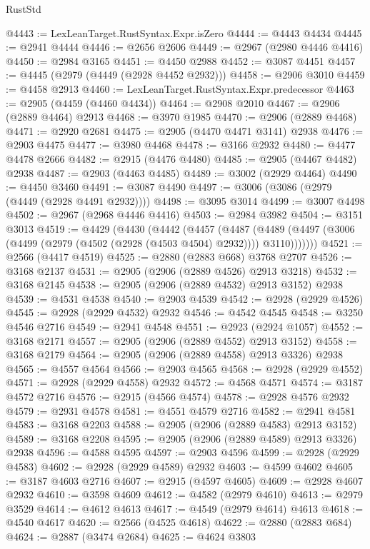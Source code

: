 \begin{lexlean}{RustStd}
\begin{coremodule}
{\begin{coremodule}
{{{{{{{{{{{{{{{{{{{{{{{{{{{{{{{{{{{{{{{{{{{{{{{{{{{{{{{{{{{{{{{{{{{{{{{{{{{{{{@4443 := LexLeanTarget.RustSyntax.Expr.isZero
@4444 := @4443 @4434
@4445 := @2941 @4444
@4446 := @2656 @2606
@4449 := @2967 (@2980 @4446 @4416)
@4450 := @2984 @3165
@4451 := @4450 @2988
@4452 := @3087 @4451
@4457 := @4445 (@2979 (@4449 (@2928 @4452 @2932)))
@4458 := @2906 @3010
@4459 := @4458 @2913
@4460 := LexLeanTarget.RustSyntax.Expr.predecessor
@4463 := @2905 (@4459 (@4460 @4434))
@4464 := @2908 @2010
@4467 := @2906 (@2889 @4464) @2913
@4468 := @3970 @1985
@4470 := @2906 (@2889 @4468)
@4471 := @2920 @2681
@4475 := @2905 (@4470 @4471 @3141) @2938
@4476 := @2903 @4475
@4477 := @3980 @4468
@4478 := @3166 @2932
@4480 := @4477 @4478 @2666
@4482 := @2915 (@4476 @4480)
@4485 := @2905 (@4467 @4482) @2938
@4487 := @2903 (@4463 @4485)
@4489 := @3002 (@2929 @4464)
@4490 := @4450 @3460
@4491 := @3087 @4490
@4497 := @3006 (@3086 (@2979 (@4449 (@2928 @4491 @2932))))
@4498 := @3095 @3014
@4499 := @3007 @4498
@4502 := @2967 (@2968 @4446 @4416)
@4503 := @2984 @3982
@4504 := @3151 @3013
@4519 := @4429
    (@4430
      (@4442
        (@4457
          (@4487
            (@4489 (@4497 (@3006 (@4499 (@2979 (@4502 (@2928 (@4503 @4504) @2932)))) @3110)))))))
@4521 := @2566 (@4417 @4519)
@4525 := @2880 (@2883 @668) @3768 @2707
@4526 := @3168 @2137
@4531 := @2905 (@2906 (@2889 @4526) @2913 @3218)
@4532 := @3168 @2145
@4538 := @2905 (@2906 (@2889 @4532) @2913 @3152) @2938
@4539 := @4531 @4538
@4540 := @2903 @4539
@4542 := @2928 (@2929 @4526)
@4545 := @2928 (@2929 @4532) @2932
@4546 := @4542 @4545
@4548 := @3250 @4546 @2716
@4549 := @2941 @4548
@4551 := @2923 (@2924 @1057)
@4552 := @3168 @2171
@4557 := @2905 (@2906 (@2889 @4552) @2913 @3152)
@4558 := @3168 @2179
@4564 := @2905 (@2906 (@2889 @4558) @2913 @3326) @2938
@4565 := @4557 @4564
@4566 := @2903 @4565
@4568 := @2928 (@2929 @4552)
@4571 := @2928 (@2929 @4558) @2932
@4572 := @4568 @4571
@4574 := @3187 @4572 @2716
@4576 := @2915 (@4566 @4574)
@4578 := @2928 @4576 @2932
@4579 := @2931 @4578
@4581 := @4551 @4579 @2716
@4582 := @2941 @4581
@4583 := @3168 @2203
@4588 := @2905 (@2906 (@2889 @4583) @2913 @3152)
@4589 := @3168 @2208
@4595 := @2905 (@2906 (@2889 @4589) @2913 @3326) @2938
@4596 := @4588 @4595
@4597 := @2903 @4596
@4599 := @2928 (@2929 @4583)
@4602 := @2928 (@2929 @4589) @2932
@4603 := @4599 @4602
@4605 := @3187 @4603 @2716
@4607 := @2915 (@4597 @4605)
@4609 := @2928 @4607 @2932
@4610 := @3598 @4609
@4612 := @4582 (@2979 @4610)
@4613 := @2979 @3529
@4614 := @4612 @4613
@4617 := @4549 (@2979 @4614) @4613
@4618 := @4540 @4617
@4620 := @2566 (@4525 @4618)
@4622 := @2880 (@2883 @684)
@4624 := @2887 (@3474 @2684)
@4625 := @4624 @3803
}}}}}}}}}}}}}}}}}}}}}}}}}}}}}}}}}}}}}}}}}}}}}}}}}}}}}}}}}}}}}}}}}}}}}}}}}}}}}}
\end{coremodule}}
\end{coremodule}
\end{lexlean}
